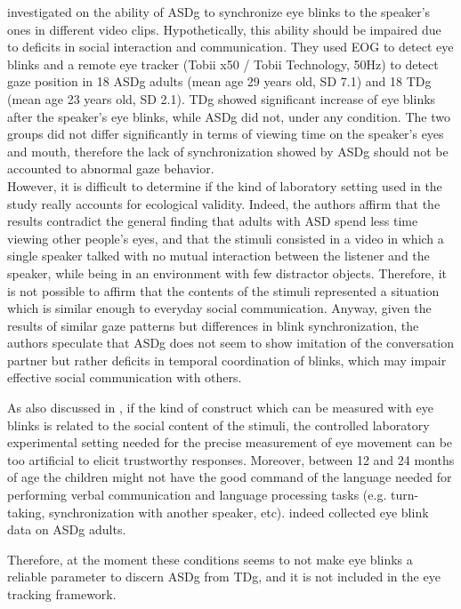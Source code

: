 \cite{nakan02011blinks} investigated on the ability of ASDg to synchronize eye blinks to the speaker’s ones in different video clips. Hypothetically, this ability should be impaired due to deficits in social interaction and communication. They used EOG to detect eye blinks and a remote eye tracker (Tobii x50 / Tobii Technology, 50Hz) to detect gaze position in 18 ASDg adults (mean age 29 years old, SD 7.1) and 18 TDg (mean age 23 years old, SD 2.1). TDg showed significant increase of eye blinks after the speaker’s eye blinks, while ASDg did not, under any condition. The two groups did not differ significantly in terms of viewing time on the speaker’s eyes and mouth, therefore the lack of synchronization showed by ASDg should not be accounted to abnormal gaze behavior.\\
However, it is difficult to determine if the kind of laboratory setting used in the study really accounts for ecological validity. Indeed, the authors affirm that the results contradict the general finding that adults with ASD spend less time viewing other people’s eyes, and that the stimuli consisted in a video in which a single speaker talked with no mutual interaction between the listener and the speaker, while being in an environment with few distractor objects. Therefore, it is not possible to affirm that the contents of the stimuli represented a situation which is similar enough to everyday social communication. Anyway, given the results of similar gaze patterns but differences in blink synchronization, the authors speculate that ASDg does not seem to show imitation of the conversation partner but rather deficits in temporal coordination of blinks, which may impair effective social communication with others.

As also discussed in , if the kind of construct which can be measured with eye blinks is related to the social content of the stimuli, the controlled laboratory experimental setting needed for the precise measurement of eye movement can be too artificial to elicit trustworthy responses. Moreover, between 12 and 24 months of age the children might not have the good command of the language needed for performing verbal communication and language processing tasks (e.g. turn-taking, synchronization with another speaker, etc).  \cite{nakan02011blinks} indeed collected eye blink data on ASDg adults.

Therefore, at the moment these conditions seems to not make eye blinks a reliable parameter to discern ASDg from TDg, and it is not included in the eye tracking framework.
